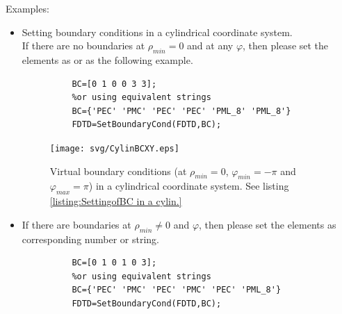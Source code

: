 \begin{FontDescr}{Examples:}
\begin{itemize}
\begin{myindentpar}
\begin{lstlisting}
		(2*dl*pow(2.5,W/dl)-1)*pow(2.5, D/dl)/Z');
			      \end{lstlisting}
	      \end{myindentpar}
	  \item Setting boundary conditions in a cylindrical coordinate system.\\
	  If there are no boundaries at  $\rho_{min}=0$ and at any $\varphi$, then please set the elements as  or  as the following example.
	      \begin{lstlisting}[caption={\matv{BC} assignment in a cylindrical coordinate system as fig \ref{fig:Ex. SetBoundaryCond in cylin.}},label={listing:SettingofBC in a cylin.}]
		  % no boundaries at rhomin=0 , phi_min and phi_max
		  BC=[0 1 0 0 3 3];
		  %or using equivalent strings
		  BC={'PEC' 'PMC' 'PEC' 'PEC' 'PML_8' 'PML_8'}
		  FDTD=SetBoundaryCond(FDTD,BC);
				  \end{lstlisting}
	      \begin{figure}[ht]
				    \centering
				  \texttt{[image: svg/CylinBCXY.eps]}\qquad
				    \caption[ Setting virtual boundary conditions ($\rho_{min}=0$, $\varphi_{min}=-\pi$ and   $\varphi_{max}=\pi$) in a cylindrical coordinate system]{Virtual boundary conditions (at $\rho_{min}=0$, $\varphi_{min}=-\pi$ and   $\varphi_{max}=\pi$)  in a cylindrical coordinate system. See listing \ref{listing:SettingofBC in a cylin.}}
				    \label{fig:Ex. SetBoundaryCond in cylin.}
			      \end{figure}
	  \item If there are boundaries at $\rho_{min}\neq0$ and $\varphi$, then please set the elements as corresponding number or string.
	  \begin{lstlisting}[caption={\matv{BC} assignment in a cylindrical coordinate system as fig \ref{fig:Ex. SetBoundaryCond in cylin. Half}},label={listing:SettingofBC in a cylin. Half}]
		  % no boundaries at rhomin=0 , phi_min and phi_max
		  BC=[0 1 0 1 0 3];
		  %or using equivalent strings
		  BC={'PEC' 'PMC' 'PEC' 'PMC' 'PEC' 'PML_8'}
		  FDTD=SetBoundaryCond(FDTD,BC);
				  \end{lstlisting}
	      \begin{figure}[H]
				    \centering
	  \qquad

\end{figure}
\end{itemize}
\end{FontDescr}
